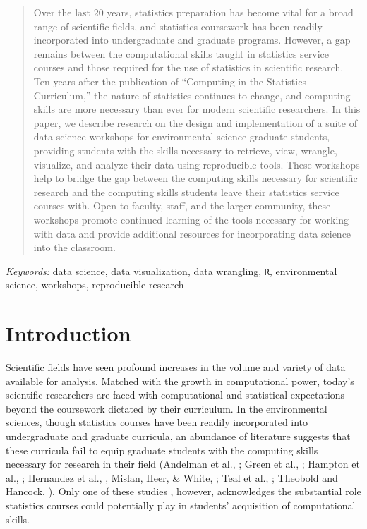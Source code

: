 \documentclass[12pt]{article}
\begin{document}
\begin{abstract}

\noindent Over the last 20 years, statistics preparation has become vital for a
broad range of scientific fields, and statistics coursework has been readily 
incorporated into undergraduate and graduate programs. However, a gap remains 
between the computational skills taught in statistics service courses and those
required for the use of statistics in scientific research. Ten years after the 
publication of ``Computing in the Statistics Curriculum,'' the nature of 
statistics continues to change, and computing skills are more necessary than 
ever for modern scientific researchers. In this paper, we describe research on 
the design and implementation of a suite of data science workshops for 
environmental science graduate students, providing students with the skills 
necessary to retrieve, view, wrangle, visualize, and analyze their data using 
reproducible tools. These workshops help to bridge the gap between the computing
skills necessary for scientific research and the computing skills students 
leave their statistics service courses with. Open to faculty, staff, and the 
larger community, these workshops promote continued learning of the tools
necessary for working with data and provide additional resources for
incorporating data science into the classroom.

\end{abstract}

\noindent %
{\it Keywords:} data science, data visualization, data wrangling, \texttt{R}, 
environmental science, workshops, reproducible research 

\vfill

\newpage
{}

\section{Introduction}
\label{sec:intro}

\noindent Scientific fields have seen profound increases in the volume and variety 
of data available for analysis. Matched with the growth in computational power, 
today's scientific researchers are faced with computational and statistical 
expectations beyond the coursework dictated by their curriculum. In the
environmental sciences, though statistics courses have been readily incorporated
into undergraduate and graduate curricula, an abundance of literature suggests 
that these curricula fail to equip graduate students with the computing skills 
necessary for research in their field (Andelman et al., \citeyear{andelman}; 
Green et al., \citeyear{green}; Hampton et al., \citeyear{hampton}; Hernandez et
al., \citeyear{hernandez}, Mislan, Heer, \& White, \citeyear{mislan}; Teal et 
al., \citeyear{carpentry}; Theobold and Hancock, \citeyear{theobold}). Only 
one of these studies \citep{theobold}, however, acknowledges the substantial 
role statistics courses could potentially play in students' acquisition of 
computational skills. 
\end{document}
